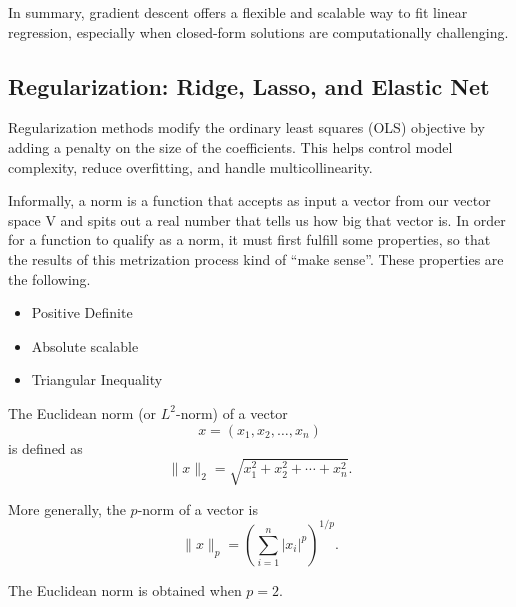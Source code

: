 \documentclass[10pt,a4paper]{article}
\begin{document}
	In summary, gradient descent offers a flexible and scalable way to fit linear regression, especially when closed-form solutions are computationally challenging.



	\subsection{Regularization: Ridge, Lasso, and Elastic Net}

	Regularization methods modify the ordinary least squares (OLS) objective by adding a penalty on the size of the coefficients.
	This helps control model complexity, reduce overfitting, and handle multicollinearity.
	
	Informally, a norm is a function that accepts as input a vector from our vector space V
	and spits out a real number that tells us how big that vector is. In order for a function to qualify as a norm, it must first fulfill some properties, so that the results of this metrization process kind of “make sense”. These properties are the following.
		\begin{itemize}
			\item Positive Definite
			\item Absolute scalable
			\item Triangular Inequality
		\end{itemize}
	
	The Euclidean norm (or \(L^2\)-norm) of a vector
	\[
	x = (x_1, x_2, \dots, x_n)
	\]
	is defined as
	\[
	\|x\|_2 = \sqrt{x_1^2 + x_2^2 + \cdots + x_n^2}.
	\]
	
	More generally, the \(p\)-norm of a vector is
	\[
	\|x\|_p = \left( \sum_{i=1}^{n} |x_i|^p \right)^{1/p}.
	\]
	
	The Euclidean norm is obtained when \(p = 2\).
	
\end{document}
